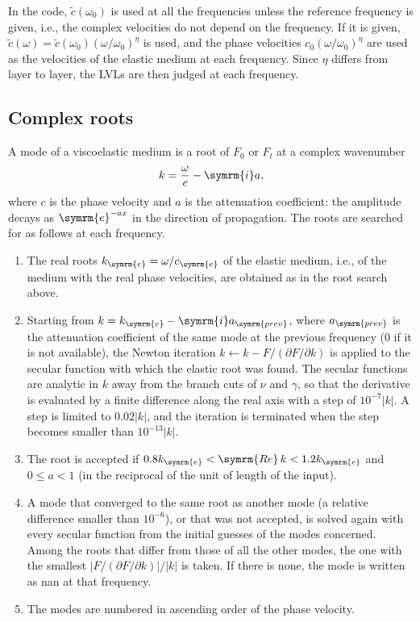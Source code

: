 \documentclass[a4paper, 10pt]{article}
\begin{document}
In the code, $\tilde{c}(\omega_0)$ is used at all the frequencies unless the reference frequency is given, i.e., the complex velocities do not depend on the frequency.
If it is given, $\tilde{c}(\omega) = \tilde{c}(\omega_0) (\omega / \omega_0)^{\eta}$ is used, and the phase velocities $c_0 (\omega / \omega_0)^{\eta}$ are used as the velocities of the elastic medium at each frequency.
Since $\eta$ differs from layer to layer, the LVLs are then judged at each frequency.

\subsection{Complex roots}

A mode of a viscoelastic medium is a root of $F_0$ or $F_l$ at a complex wavenumber
\begin{align}
  k = \frac{\omega}{c} - \symrm{i} a,
\end{align}
where $c$ is the phase velocity and $a$ is the attenuation coefficient: the amplitude decays as $\symrm{e}^{-a x}$ in the direction of propagation.
The roots are searched for as follows at each frequency.
\begin{enumerate}
  \item The real roots $k_{\symrm{e}} = \omega / c_{\symrm{e}}$ of the elastic medium, i.e., of the medium with the real phase velocities, are obtained as in the root search above.
  \item Starting from $k = k_{\symrm{e}} - \symrm{i} a_{\symrm{prev}}$, where $a_{\symrm{prev}}$ is the attenuation coefficient of the same mode at the previous frequency ($0$ if it is not available), the Newton iteration $k \leftarrow k - F / (\partial F / \partial k)$ is applied to the secular function with which the elastic root was found. The secular functions are analytic in $k$ away from the branch cuts of $\nu$ and $\gamma$, so that the derivative is evaluated by a finite difference along the real axis with a step of $10^{-7} |k|$. A step is limited to $0.02 |k|$, and the iteration is terminated when the step becomes smaller than $10^{-13} |k|$.
  \item The root is accepted if $0.8 k_{\symrm{e}} < \symrm{Re}\, k < 1.2 k_{\symrm{e}}$ and $0 \leq a < 1$ (in the reciprocal of the unit of length of the input).
  \item A mode that converged to the same root as another mode (a relative difference smaller than $10^{-6}$), or that was not accepted, is solved again with every secular function from the initial guesses of the modes concerned. Among the roots that differ from those of all the other modes, the one with the smallest $|F / (\partial F / \partial k)| / |k|$ is taken. If there is none, the mode is written as nan at that frequency.
  \item The modes are numbered in ascending order of the phase velocity.
\end{enumerate}
\end{document}
